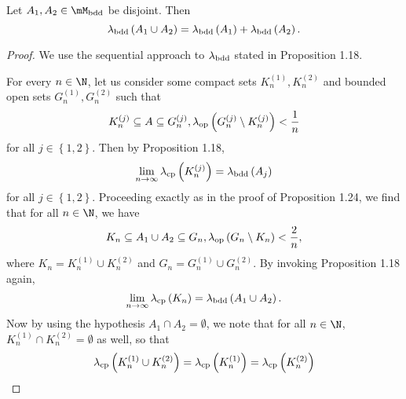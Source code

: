 \documentclass[pmath450]{subfiles}
\begin{document}
    \clearpage
    \begin{prop}{}
        Let $A_1,A_2\in\mM_{\bdd}$ be disjoint. Then
        \begin{equation*}
            \lambda_{\operatorname{bdd}}\left( A_1\cup A_2 \right) = \lambda_{\operatorname{bdd}}\left( A_1 \right)+\lambda_{\operatorname{bdd}}\left( A_2 \right).
        \end{equation*}
    \end{prop}

    \begin{proof}
        We use the sequential approach to $\lambda_{\operatorname{bdd}}$ stated in Proposition 1.18.

        For every $n\in\N$, let us consider some compact sets $K_n^{\left( 1 \right)},K_n^{\left( 2 \right)}$ and bounded open sets $G_n^{\left( 1 \right)},G_n^{\left( 2 \right)}$ such that
        \begin{equation*}
            K_n^{\left( j \right)}\subseteq A\subseteq G_n^{\left( j \right)}, \lambda_{\operatorname{op}}\left( G_n^{\left( j \right)}\setminus K_n^{\left( j \right)} \right)<\frac{1}{n}
        \end{equation*}
        for all $j\in\left\lbrace 1,2 \right\rbrace$. Then by Proposition 1.18,
        \begin{equation}
            \lim_{n\to\infty}\lambda_{\operatorname{cp}}\left( K_n^{\left( j \right)} \right)=\lambda_{\operatorname{bdd}}\left( A_j \right)
        \end{equation}
        for all $j\in\left\lbrace 1,2 \right\rbrace$. Proceeding exactly as in the proof of Proposition 1.24, we find that for all $n\in\N$, we have
        \begin{equation*}
            K_n\subseteq A_1\cup A_2\subseteq G_n, \lambda_{\operatorname{op}}\left( G_n\setminus K_n \right)<\frac{2}{n},
        \end{equation*}
        where $K_n=K_n^{\left( 1 \right)}\cup K_n^{\left( 2 \right)}$ and $G_n=G_n^{\left( 1 \right)}\cup G_n^{\left( 2 \right)}$. By invoking Proposition 1.18 again,
        \begin{equation}
            \lim_{n\to\infty}\lambda_{\operatorname{cp}}\left( K_n \right) = \lambda_{\operatorname{bdd}}\left( A_1\cup A_2 \right).
        \end{equation}
        Now by using the hypothesis $A_1\cap A_2=\emptyset$, we note that for all $n\in\N$, $K_n^{\left( 1 \right)}\cap K_n^{\left( 2 \right)}=\emptyset$ as well, so that
        \begin{equation*}
            \lambda_{\cp}\left( K_n^{\left( 1 \right)}\cup K_n^{\left( 2 \right)} \right) = \lambda_{\cp}\left( K_n^{\left( 1 \right)} \right)=\lambda_{\cp}\left( K_n^{\left( 2 \right)} \right)

\end{equation*}
\end{proof}
\end{document}
